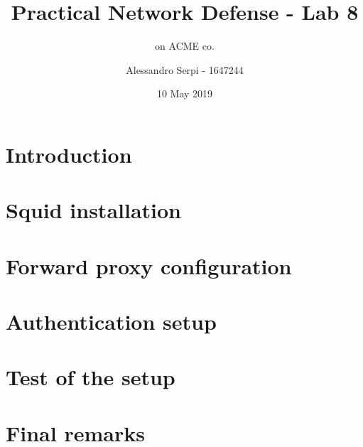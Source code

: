 \documentclass[draft]{homework}
\title{Practical Network Defense - Lab 8}
\subtitle{\sq on ACME co.}
\author{Alessandro Serpi - 1647244}
\date{10 May 2019}
\newcommand{\sq}{Squid\xspace}
\begin{document}
    \maketitle
    \tableofcontents
    
    
    \pagebreak
    \section{Introduction}
    
    
    \section{\sq installation}
    
    
    \section{Forward proxy configuration}
    
    
    \section{Authentication setup}
    
    
    \section{Test of the setup}
    
    
    \section{Final remarks}
\end{document}
